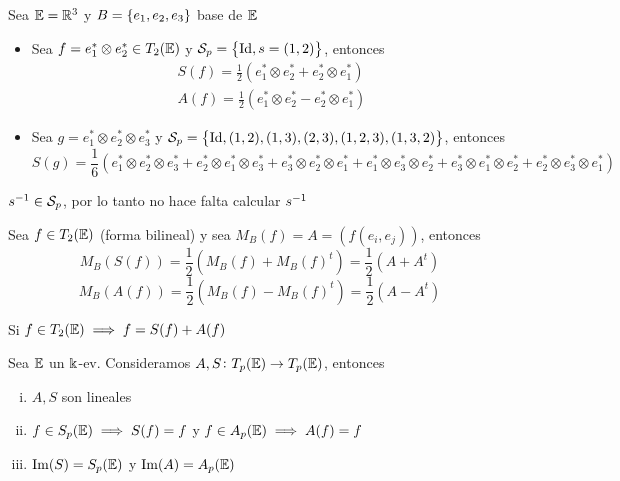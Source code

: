 \begin{example}
    Sea $\mathbb{E} = \mathbb{R}^3$ y $B = \left\{e_1,e_2,e_3\right\}$ base de $\mathbb{E}$
    \begin{itemize}
        \item Sea $f = e_1^* \otimes e_2^* \in T_2(\mathbb{E})$ y $\mathcal{S}_p=\left\{\operatorname{Id},s=(1,2)\right\}$,
        entonces
        \begin{gather*}
            S(f) = \frac{1}{2} (e_1^* \otimes e_2^* + e_2^* \otimes e_1^*) \\
            A(f) = \frac{1}{2} (e_1^* \otimes e_2^* - e_2^* \otimes e_1^*)
        \end{gather*}
        \item Sea $g = e_1^* \otimes e_2^* \otimes e_3^*$ y $\mathcal{S}_p =
        \left\{\operatorname{Id},(1,2),(1,3),(2,3),(1,2,3),(1,3,2)\right\}$, entonces
        \[
            S(g) = \frac{1}{6} (e_1^*\otimes e_2^*\otimes e_3^* + e_2^*\otimes e_1^*\otimes e_3^* +
            e_3^*\otimes e_2^*\otimes e_1^* + e_1^*\otimes e_3^*\otimes e_2^* +
            e_3^*\otimes e_1^*\otimes e_2^* + e_2^*\otimes e_3^*\otimes e_1^*)
        \]
    \end{itemize}
\end{example}
\begin{obs}
    $s^{-1} \in \mathcal{S}_p$, por lo tanto no hace falta calcular $s^{-1}$
\end{obs}
\begin{example}
    Sea $f \in T_2(\mathbb{E})$ (forma bilineal) y sea $M_B(f)=A= \left( f(e_i,e_j) \right)$, entonces
    \[
        M_B(S(f)) = \frac{1}{2}\left( M_B(f) + M_B(f)^t \right) = \frac{1}{2}(A + A^t)
    \]
    \[
        M_B(A(f)) = \frac{1}{2}\left( M_B(f) - M_B(f)^t \right) = \frac{1}{2}(A - A^t)
    \]
\end{example}
\begin{obs}
    Si $f \in T_2(\mathbb{E}) \implies f = S(f) + A(f)$
\end{obs}
\begin{prop}
    Sea $\mathbb{E}$ un $\Bbbk$-ev. Consideramos $A,S \colon T_p(\mathbb{E}) \to T_p(\mathbb{E})$, entonces
    \begin{enumerate}[i)]
        \item $A,S$ son lineales
        \item\label{item:s_sp} $f \in S_p(\mathbb{E}) \implies S(f) = f$ y $f \in A_p(\mathbb{E}) \implies A(f) = f$
        \item $\operatorname{Im}(S)=S_p(\mathbb{E})$ y $\operatorname{Im}(A)=A_p(\mathbb{E})$
    \end{enumerate}
\end{prop}
